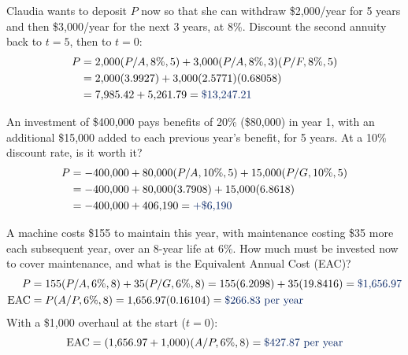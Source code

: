 \begin{example}
    Claudia wants to deposit $P$ now so that she can withdraw \$2,000/year
    for 5 years and then \$3,000/year for the next 3 years, at 8\%.
    Discount the second annuity back to $t=5$, then to $t=0$:
    \begin{align*}
        P &= 2{,}000(P/A,8\%,5) + 3{,}000(P/A,8\%,3)(P/F,8\%,5)\\
        &= 2{,}000(3.9927) + 3{,}000(2.5771)(0.68058)\\
        &= 7{,}985.42 + 5{,}261.79 = \db{\$13{,}247.21}
    \end{align*}
    \begin{center}
    \end{center}
\end{example}

\begin{example}
    An investment of \$400,000 pays benefits of 20\% (\$80,000) in year 1,
    with an additional \$15,000 added to each previous year's benefit, for
    5 years. At a 10\% discount rate, is it worth it?
    \begin{align*}
        P &= -400{,}000 + 80{,}000(P/A,10\%,5) + 15{,}000(P/G,10\%,5)\\
        &= -400{,}000 + 80{,}000(3.7908) + 15{,}000(6.8618)\\
        &= -400{,}000 + 406{,}190 = \db{+\$6{,}190}
    \end{align*}
\end{example}

\begin{example}
    A machine costs \$155 to maintain this year, with maintenance
    costing \$35 more each subsequent year, over an 8-year life at 6\%.
    How much must be invested now to cover maintenance, and what is the
    Equivalent Annual Cost (EAC)?
    \begin{align*}
        P &= 155(P/A,6\%,8) + 35(P/G,6\%,8) = 155(6.2098) + 35(19.8416) = \db{\$1{,}656.97}\\
        \text{EAC} &= P(A/P,6\%,8) = 1{,}656.97(0.16104) = \db{\$266.83 \text{ per year}}
    \end{align*}
    With a \$1,000 overhaul at the start ($t=0$):
    \[\text{EAC} = (1{,}656.97 + 1{,}000)(A/P,6\%,8) = \db{\$427.87 \text{ per year}}\]
\end{example}

